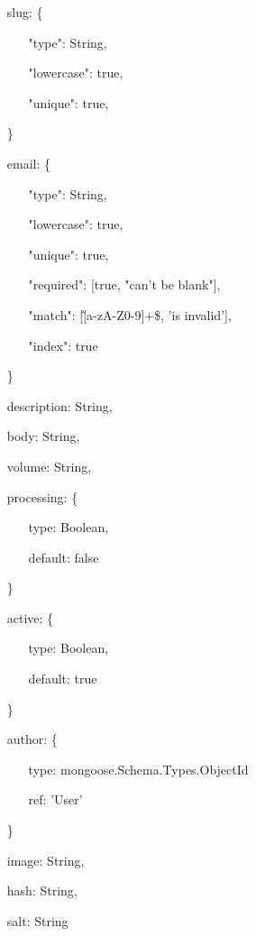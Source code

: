 \documentclass{article}
\begin{document}
\begin{itemize}
	\item[slug: \{]
	\begin{itemize}
		\item[]
		\item[]"type": String,
		\item[]"lowercase": true,
		\item[]"unique": true,
	\end{itemize}
	\item[\}]
	\item[email: \{]
	\begin{itemize}
		\item[]
		\item[]"type": String,
		\item[]"lowercase": true,
		\item[]"unique": true,
		\item[]"required": [true, "can't be blank"],
		\item[]"match": [\/\^[a-zA-Z0-9]+\$\/, 'is invalid'],
		\item[]"index": true
	\end{itemize}
	\item[\}]
	\item[]description: String,
	\item[]body: String,
	\item[]volume: String,
	\item[processing: \{]
	\begin{itemize}
		\item[]
		\item[]type: Boolean,
		\item[]default: false 
	\end{itemize}
	\item[\}]
	\item[active: \{]
	\begin{itemize}
		\item[]
		\item[]type: Boolean,
		\item[]default: true 
	\end{itemize}
	\item[\}]
	\item[author: \{]
	\begin{itemize}
		\item[]
		\item[]type: mongoose.Schema.Types.ObjectId
		\item[]ref: 'User'
	\end{itemize}
	\item[\}]
	\item[]image: String,
	\item[]hash: String,
  	\item[]salt: String 
\end{itemize}
\end{document}
